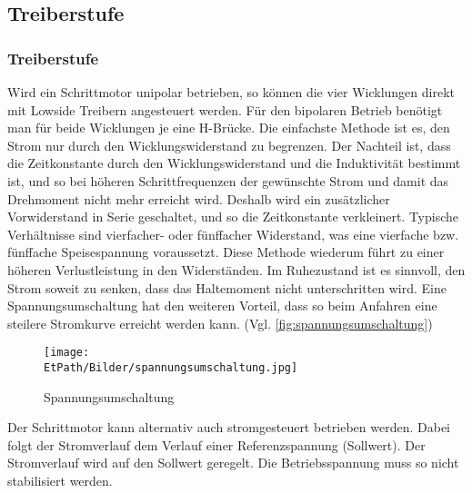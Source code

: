 \ifSTANDALONE
\subsection{Treiberstufe}
\fi
\ifEMBED
\subsubsection{Treiberstufe}
\fi 
	Wird ein Schrittmotor unipolar betrieben, so können die vier Wicklungen 
    direkt mit Lowside Treibern angesteuert werden. Für den bipolaren 
    Betrieb benötigt man für beide Wicklungen je eine H-Brücke. Die 
    einfachste Methode ist es, den Strom nur durch den Wicklungswiderstand 
    zu begrenzen. Der Nachteil ist, dass die Zeitkonstante durch den 
    Wicklungswiderstand und die Induktivität bestimmt ist, und so bei 
    höheren Schrittfrequenzen der gewünschte Strom und damit das 
    Drehmoment nicht mehr erreicht wird. Deshalb wird ein zusätzlicher 
    Vorwiderstand in Serie geschaltet, und so die Zeitkonstante 
    verkleinert. Typische Verhältnisse sind vierfacher- oder fünffacher 
    Widerstand, was eine vierfache bzw. fünffache Speisespannung 
    voraussetzt. Diese Methode wiederum führt zu einer höheren 
    Verlustleistung in den Widerständen. Im Ruhezustand ist es sinnvoll, 
    den Strom soweit zu senken, dass das Haltemoment nicht unterschritten 
    wird. Eine Spannungsumschaltung hat den weiteren Vorteil, dass so beim 
    Anfahren eine steilere Stromkurve erreicht werden kann. (Vgl. 
    \autoref{fig:spannungsumschaltung})
	 \begin{figure}[h!]
	 	\centering
	 	\texttt{[image: \\EtPath/Bilder/spannungsumschaltung.jpg]}
	 	\caption[Spannungsumschaltung]{Spannungsumschaltung \cite{AppNote:Stepper}}
	 	\label{fig:spannungsumschaltung}
	 \end{figure}

    \noindent
	Der Schrittmotor kann alternativ auch stromgesteuert betrieben werden. 
    Dabei folgt der Stromverlauf dem Verlauf einer Referenzspannung 
    (Sollwert). Der Stromverlauf wird auf den Sollwert geregelt. Die 
    Betriebsspannung muss so nicht stabilisiert werden. 
    \label{stromgesteuert} 

